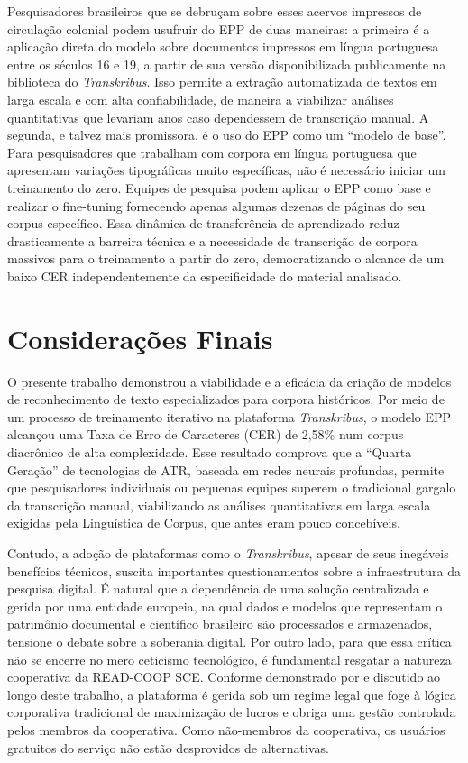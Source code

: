 \documentclass[portuguese]{textolivre}
\begin{document}
Pesquisadores brasileiros que se debruçam sobre esses acervos impressos de circulação colonial podem usufruir do EPP de duas maneiras: a primeira é a aplicação direta do modelo sobre documentos impressos em língua portuguesa entre os séculos 16 e 19, a partir de sua versão disponibilizada publicamente na biblioteca do \textit{Transkribus}. Isso permite a extração automatizada de textos em larga escala e com alta confiabilidade, de maneira a viabilizar análises quantitativas que levariam anos caso dependessem de transcrição manual. A segunda, e talvez mais promissora, é o uso do EPP como um “modelo de base”. Para pesquisadores que trabalham com corpora em língua portuguesa que apresentam variações tipográficas muito específicas, não é necessário iniciar um treinamento do zero. Equipes de pesquisa podem aplicar o EPP como base e realizar o fine-tuning fornecendo apenas algumas dezenas de páginas do seu corpus específico. Essa dinâmica de transferência de aprendizado reduz drasticamente a barreira técnica e a necessidade de transcrição de corpora massivos para o treinamento a partir do zero, democratizando o alcance de um baixo CER independentemente da especificidade do material analisado.

\section{Considerações Finais}

O presente trabalho demonstrou a viabilidade e a eficácia da criação de modelos de reconhecimento de texto especializados para corpora históricos. Por meio de um processo de treinamento iterativo na plataforma \textit{Transkribus}, o modelo EPP alcançou uma Taxa de Erro de Caracteres (CER) de 2,58\% num corpus diacrônico de alta complexidade. Esse resultado comprova que a “Quarta Geração” de tecnologias de ATR, baseada em redes neurais profundas, permite que pesquisadores individuais ou pequenas equipes superem o tradicional gargalo da transcrição manual, viabilizando as análises quantitativas em larga escala exigidas pela Linguística de Corpus, que antes eram pouco concebíveis.

Contudo, a adoção de plataformas como o \textit{Transkribus}, apesar de seus inegáveis benefícios técnicos, suscita importantes questionamentos sobre a infraestrutura da pesquisa digital. É natural que a dependência de uma solução centralizada e gerida por uma entidade europeia, na qual dados e modelos que representam o patrimônio documental e científico brasileiro são processados e armazenados, tensione o debate sobre a soberania digital. Por outro lado, para que essa crítica não se encerre no mero ceticismo tecnológico, é fundamental resgatar a natureza cooperativa da READ-COOP SCE. Conforme demonstrado por \textcite[p.4~5]{terras2025artificial} e discutido ao longo deste trabalho, a plataforma é gerida sob um regime legal que foge à lógica corporativa tradicional de maximização de lucros e obriga uma gestão controlada pelos membros da cooperativa. Como não-membros da cooperativa, os usuários gratuitos do serviço não estão desprovidos de alternativas.
\end{document}
